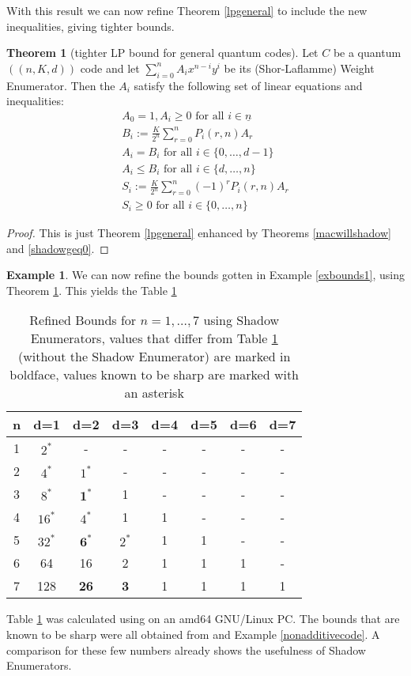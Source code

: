 \documentclass[12pt,a4paper,BCOR15mm,twoside,DIV12]{article}
\def\n{\underline{n}}
\def\fa{\text{ for all }}
\theoremstyle{definition}
\newtheorem{theorem}[Satz]{Theorem}
\newtheorem{ex}[Satz]{Example}
\begin{document}
With this result we can now refine Theorem \ref{lpgeneral} to include the new inequalities, giving tighter bounds.

\begin{theorem}[tighter LP bound for general quantum codes]\label{lpshadow}
Let $C$ be a quantum $((n,K,d))$ code and let $\sum_{i=0}^n A_i x^{n-i} y^{i}$ be its (Shor-Laflamme) Weight Enumerator. Then the $A_i$ satisfy the following set of linear equations and inequalities:
\begin{align}
A_0 = 1, A_i \geq 0 \fa i \in \n \\
B_i := \frac{K}{2^{n}} \sum_{r=0}^n P_i(r,n) A_r \\
A_i = B_i \fa i \in \{0, \ldots, d-1 \} \\
A_i \leq B_i \fa i \in \{d, \ldots, n \} \\
S_i := \frac{K}{2^{n}} \sum_{r=0}^n (-1)^r P_i(r,n) A_r \\
S_i \geq 0 \fa i \in \{0, \ldots, n \}
\end{align}
\begin{proof}
This is just Theorem \ref{lpgeneral} enhanced by Theorems \ref{macwillshadow} and \ref{shadowgeq0}.
\end{proof}
\end{theorem}

\begin{ex}
We can now refine the bounds gotten in Example \ref{exbounds1}, using Theorem \ref{lpshadow}. This yields the Table \ref{tablebounds2}

\begin{table}[h]\label{tablebounds2}
\centering
\begin{tabular}{|c|c|c|c|c|c|c|c|}
\hline

n & d=1 & d=2 & d=3 & d=4 & d=5 & d=6 & d=7\\ \hline
1 & $2^*$ & - & - & - & - & - & - \\ \hline
2 & $4^*$ & $1^*$ & - & - & - & - & - \\ \hline
3 & $8^*$ & $\textbf{1}^*$ & 1 & - & - & - & - \\ \hline
4 & $16^*$ & $4^*$ & 1 & 1 & - & - & - \\ \hline
5 & $32^*$& $\textbf{6}^*$ & $2^*$ & 1& 1& - & -  \\ \hline
6 &64 &16  & 2 &1  &1  &1 & - \\ \hline
7 & 128 & \textbf{26} & \textbf{3}& 1& 1& 1& 1 \\ \hline 
\end{tabular}
\caption{Refined Bounds for $n=1, \ldots, 7$ using Shadow Enumerators, values that differ from Table \ref{tablebounds2} (without the Shadow Enumerator) are marked in boldface, values known to be sharp are marked with an asterisk}
\end{table}
\end{ex}
Table \ref{tablebounds2} was calculated using \cite{maple} on an amd64 GNU/Linux PC. The bounds that are known to be sharp were all obtained from \cite{codetables} and Example \ref{nonadditivecode}.
A comparison for these few numbers already shows the usefulness of Shadow Enumerators.
\end{document}
